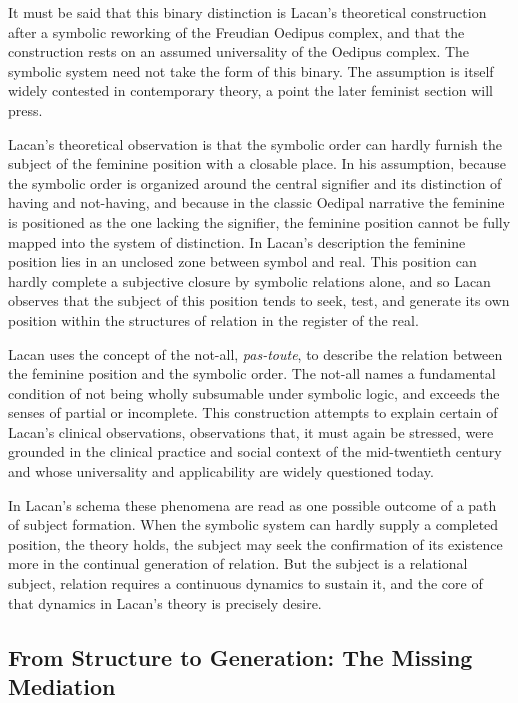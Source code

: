 \documentclass[11pt,a4paper]{article}
\begin{document}
It must be said that this binary distinction is Lacan's theoretical construction after a symbolic reworking of the Freudian Oedipus complex, and that the construction rests on an assumed universality of the Oedipus complex. The symbolic system need not take the form of this binary. The assumption is itself widely contested in contemporary theory, a point the later feminist section will press.

Lacan's theoretical observation is that the symbolic order can hardly furnish the subject of the feminine position with a closable place. In his assumption, because the symbolic order is organized around the central signifier and its distinction of having and not-having, and because in the classic Oedipal narrative the feminine is positioned as the one lacking the signifier, the feminine position cannot be fully mapped into the system of distinction. In Lacan's description the feminine position lies in an unclosed zone between symbol and real. This position can hardly complete a subjective closure by symbolic relations alone, and so Lacan observes that the subject of this position tends to seek, test, and generate its own position within the structures of relation in the register of the real.

Lacan uses the concept of the not-all, \textit{pas-toute}, to describe the relation between the feminine position and the symbolic order. The not-all names a fundamental condition of not being wholly subsumable under symbolic logic, and exceeds the senses of partial or incomplete. This construction attempts to explain certain of Lacan's clinical observations, observations that, it must again be stressed, were grounded in the clinical practice and social context of the mid-twentieth century and whose universality and applicability are widely questioned today.

In Lacan's schema these phenomena are read as one possible outcome of a path of subject formation. When the symbolic system can hardly supply a completed position, the theory holds, the subject may seek the confirmation of its existence more in the continual generation of relation. But the subject is a relational subject, relation requires a continuous dynamics to sustain it, and the core of that dynamics in Lacan's theory is precisely desire.

\subsection{From Structure to Generation: The Missing Mediation}
\end{document}
